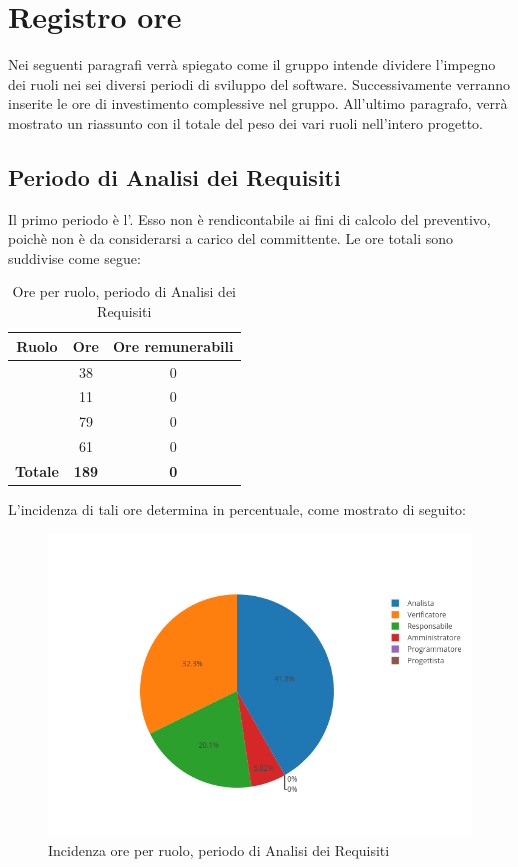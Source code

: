 \newpage
\section{Registro ore}
Nei seguenti paragrafi verrà spiegato come il gruppo intende dividere l'impegno dei ruoli nei sei diversi periodi di sviluppo del software. Successivamente verranno inserite le ore di investimento complessive nel gruppo. 
All'ultimo paragrafo, verrà mostrato un riassunto con il totale del peso dei vari ruoli nell'intero progetto.

\subsection{Periodo di Analisi dei Requisiti}
Il primo periodo è l'\AdR. Esso non è rendicontabile ai fini di calcolo del preventivo, poichè non è da considerarsi a carico del committente. Le ore totali sono suddivise come segue:

\begin{table}[H]
	\begin{center}
		\begin{tabular}{|c|c|c|}
			\hline
			\textbf{Ruolo}	& \textbf{Ore}	& \textbf{Ore remunerabili} \\
			\hline
			\Res	&	38	&  0 \\
			\hline
			\Amm	&	11	&  0 \\
			\hline
			\Ana	&	79	&  0 \\
			\hline
			\Ver	&	61	&  0 \\
			\hline
			\textbf{Totale} & \textbf{189} & \textbf{0} \\
			\hline
		\end{tabular}
	\end{center}
	\caption{Ore per ruolo, periodo di Analisi dei Requisiti}
\end{table}

L'incidenza di tali ore determina in percentuale, come mostrato di seguito:
\begin{figure}[H]
	\centering
	\includegraphics[scale=0.6]{img/AnalisiRequisiti.png}
	\caption{Incidenza ore per ruolo, periodo di Analisi dei Requisiti}
\end{figure}

